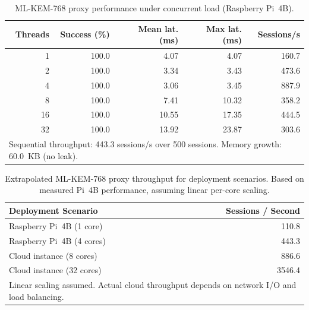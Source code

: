 \begin{table}[t]\centering
\caption{ML-KEM-768 proxy performance under concurrent load (Raspberry Pi~4B).}
\label{tab:stress}
\begin{tabular}{rrrrr}
\hline
Threads & Success (\%) & Mean lat. (ms) & Max lat. (ms) & Sessions/s \\
\hline
1 & 100.0 & 4.07 & 4.07 & 160.7 \\
2 & 100.0 & 3.34 & 3.43 & 473.6 \\
4 & 100.0 & 3.06 & 3.45 & 887.9 \\
8 & 100.0 & 7.41 & 10.32 & 358.2 \\
16 & 100.0 & 10.55 & 17.35 & 444.5 \\
32 & 100.0 & 13.92 & 23.87 & 303.6 \\
\hline
\multicolumn{5}{l}{Sequential throughput: 443.3 sessions/s over 500 sessions. Memory growth: 60.0~KB (no leak).} \\
\end{tabular}\end{table}

\begin{table}[t]\centering
\caption{Extrapolated ML-KEM-768 proxy throughput for deployment scenarios. Based on measured Pi~4B performance, assuming linear per-core scaling.}
\label{tab:extrapolation}
\begin{tabular}{lr}
\hline
Deployment Scenario & Sessions / Second \\
\hline
Raspberry Pi~4B (1 core) & 110.8 \\
Raspberry Pi~4B (4 cores) & 443.3 \\
Cloud instance (8 cores) & 886.6 \\
Cloud instance (32 cores) & 3546.4 \\
\hline
\multicolumn{2}{l}{Linear scaling assumed. Actual cloud throughput depends on network I/O and load balancing.} \\
\end{tabular}\end{table}

